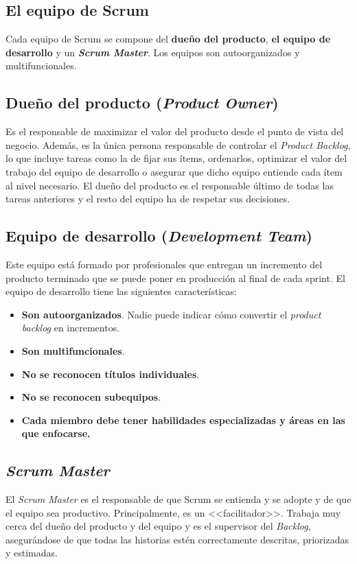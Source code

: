 \subsection{El equipo de Scrum}
Cada equipo de Scrum \cite{Schwaber2017} se compone del \textbf{dueño del producto}, \textbf{el equipo de desarrollo} y un \textbf{\textit{Scrum Master}}. Los equipos son autoorganizados y multifuncionales.

\subsection*{Dueño del producto (\textit{Product Owner})}
Es el responsable de maximizar el valor del producto desde el punto de vista del negocio. Además, es la única persona responsable de controlar el \textit{Product Backlog}, lo que incluye tareas como la de fijar sus ítems, ordenarlos, optimizar el valor del trabajo del equipo de desarrollo o asegurar que dicho equipo entiende cada ítem al nivel necesario. El dueño del producto es el responsable último de todas las tareas anteriores y el resto del equipo ha de respetar sus decisiones.

\subsection*{Equipo de desarrollo (\textit{Development Team})}
Este equipo está formado por profesionales que entregan un incremento del producto terminado que se puede poner en producción al final de cada sprint. El equipo de desarrollo tiene las siguientes características:

\begin{itemize}
	\item \textbf{Son autoorganizados}. Nadie puede indicar cómo convertir el \textit{product backlog} en incrementos.
	\item \textbf{Son multifuncionales}.
	\item \textbf{No se reconocen títulos individuales}.
	\item \textbf{No se reconocen subequipos}.
	\item \textbf{Cada miembro debe tener habilidades especializadas y áreas en las que enfocarse.}
\end{itemize}

\subsection*{\textit{Scrum Master}}
El \textit{Scrum Master} \cite{Gomez2017} es el responsable de que Scrum se entienda y se adopte y de que el equipo sea productivo. Principalmente, es un <<facilitador>>. Trabaja muy cerca del dueño del producto y del equipo y es el supervisor del \textit{Backlog}, asegurándose de que todas las historias estén correctamente descritas, priorizadas y estimadas.

